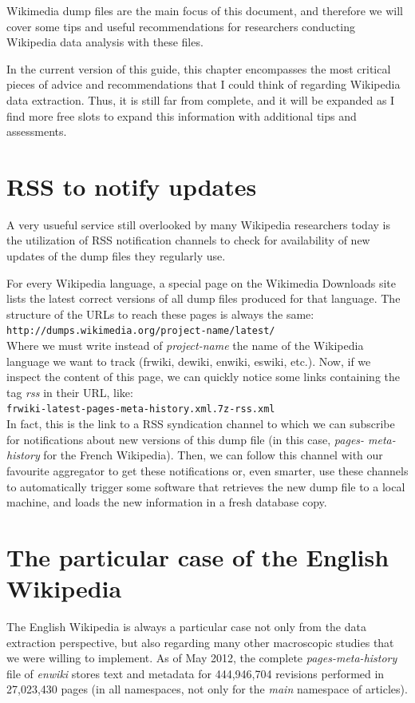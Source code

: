 Wikimedia dump files are the main focus of this document, and therefore we
will cover some tips and useful recommendations for researchers conducting 
Wikipedia data analysis with these files.

In the current version of this guide, this chapter encompasses the most
critical pieces of advice and recommendations that I could think of regarding
Wikipedia data extraction. Thus, it is still far from complete, and it will
be expanded as I find more free slots to expand this information with additional tips
and assessments.

\section{RSS to notify updates}
A very usueful service still overlooked by many Wikipedia researchers
today is the utilization of RSS notification channels to check for availability
of new updates of the dump files they regularly use.

For every Wikipedia language, a special page on the Wikimedia Downloads site
lists the latest correct versions of all dump files produced for that language.
The structure of the URLs to reach these pages is always the same:\\

\texttt{http://dumps.wikimedia.org/project-name/latest/}\\

Where we must write instead of \textit{project-name} the name of the Wikipedia
language we want to track (frwiki, dewiki, enwiki, eswiki, etc.). Now, if we
inspect the content of this page, we can quickly notice some links containing
the tag \textit{rss} in their URL, like:\\

\texttt{frwiki-latest-pages-meta-history.xml.7z-rss.xml}\\

In fact, this is the link to a RSS syndication channel to which we can subscribe
for notifications about new versions of this dump file (in this case, \textit{pages-
meta-history} for the French Wikipedia). Then, we can follow this channel with our
favourite aggregator to get these notifications or, even smarter, use these channels
to automatically trigger some software that retrieves the new dump file
to a local machine, and loads the new information in a fresh database copy.

\section{The particular case of the English Wikipedia}
The English Wikipedia is always a particular case not only from the data extraction
perspective, but also regarding many other macroscopic studies that we were willing
to implement. As of May 2012, the complete \textit{pages-meta-history} file of
\textit{enwiki} stores text and metadata for 444,946,704 revisions performed in
27,023,430 pages (in all namespaces, not only for the \textit{main} namespace of articles).

